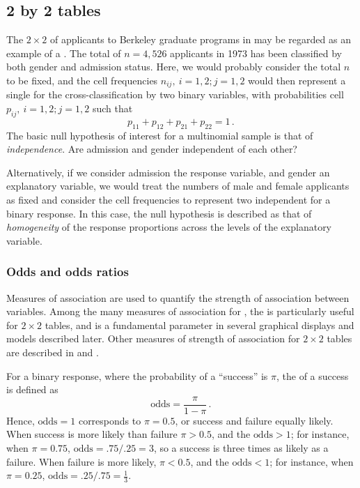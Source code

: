 \documentclass[10pt,krantz2]{krantz}\usepackage[]{graphicx}\usepackage[]{color}
\begin{document}
\subsection{2 by 2 tables}\label{sec:twoway-twobytwo}

The $2 \times 2$ \ctab of applicants to Berkeley graduate programs in  may be regarded as an example of a
.
The total of $n = 4,526$ applicants in 1973 has been classified by both
gender and admission status.
Here, we would probably consider the total $n$ to be fixed,
and the cell frequencies $n_{ij},  \: i=1,2; j=1,2$
would then represent a single
 for the cross-classification by two
binary variables,
with probabilities cell $p_{ij},  \: i=1,2; j=1,2$
such that
\begin{equation*}
 p_{11} + p_{12} + p_{21} + p_{22} = 1
 \period
\end{equation*}
The basic null hypothesis of interest for a multinomial sample is that
of \emph{independence}.  Are admission and gender independent of each other?

Alternatively, if we consider admission the response variable, and
gender an explanatory variable, we would treat the numbers of male
and female applicants as fixed
and consider the cell frequencies to represent two independent
 for a binary response.
In this case, the null hypothesis is described as that of \emph{homogeneity}
of the response proportions across the levels of the explanatory variable.

\subsubsection{Odds and odds ratios}\label{sec:twoway-odds}
Measures of association are used to quantify the strength of association
between variables.  Among the many measures of association for
\ctabs, the  is particularly useful for
$2 \times 2$ tables, and is a fundamental parameter in several
graphical displays and models described later.
Other measures of strength of association for $2 \times 2$ tables
are described in \citet[]{Stokes-etal:00} and \citet[\S 2.2]{Agresti:96}.

For a binary response, where the probability of a ``success'' is $\pi$,
the  of a success is defined as
\begin{equation*}
 \textrm{odds} = \frac{\pi}{1-\pi} \period
\end{equation*}
Hence, $\textrm{odds} = 1$ corresponds to $\pi = 0.5$, or success and
failure equally likely.   When success is more likely than failure
$\pi > 0.5$, and the $\textrm{odds} > 1$;  for instance, when $\pi = 0.75$,
$\textrm{odds} = .75/.25 =3$, so a success is three times as likely
as a failure.  When failure is more likely, $\pi < 0.5$, and the $\textrm{odds} < 1$;  for instance, when $\pi = 0.25$,
$\textrm{odds} = .25/.75 =\frac{1}{3}$.
\end{document}

